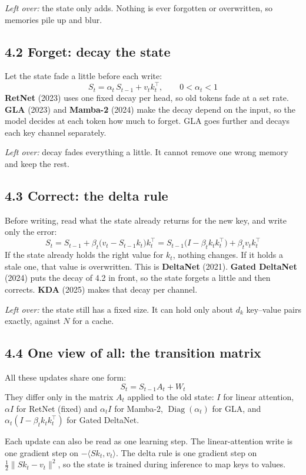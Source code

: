 \documentclass[11pt]{article}
\begin{document}
\emph{Left over:} the state only adds. Nothing is ever forgotten or overwritten, so memories pile up and blur.

\subsection{4.2 Forget: decay the state}

Let the state fade a little before each write:
\[
S_t=\alpha_t\,S_{t-1}+v_tk_t^{\top},\qquad 0<\alpha_t<1
\]
\textbf{RetNet} (2023) uses one fixed decay per head, so old tokens fade at a set rate. \textbf{GLA} (2023) and \textbf{Mamba-2} (2024) make the decay depend on the input, so the model decides at each token how much to forget. GLA goes further and decays each key channel separately.

\emph{Left over:} decay fades everything a little. It cannot remove one wrong memory and keep the rest.

\subsection{4.3 Correct: the delta rule}

Before writing, read what the state already returns for the new key, and write only the error:
\[
S_t=S_{t-1}+\beta_t\big(v_t-S_{t-1}k_t\big)k_t^{\top}=S_{t-1}\big(I-\beta_tk_tk_t^{\top}\big)+\beta_tv_tk_t^{\top}
\]
If the state already holds the right value for \(k_t\), nothing changes. If it holds a stale one, that value is overwritten. This is \textbf{DeltaNet} (2021). \textbf{Gated DeltaNet} (2024) puts the decay of 4.2 in front, so the state forgets a little and then corrects. \textbf{KDA} (2025) makes that decay per channel.

\emph{Left over:} the state still has a fixed size. It can hold only about \(d_k\) key--value pairs exactly, against \(N\) for a cache.

\subsection{4.4 One view of all: the transition matrix}

All these updates share one form:
\[
S_t=S_{t-1}A_t+W_t
\]
They differ only in the matrix \(A_t\) applied to the old state: \(I\) for linear attention, \(\alpha I\) for RetNet (fixed) and \(\alpha_tI\) for Mamba-2, \(\operatorname{Diag}(\alpha_t)\) for GLA, and \(\alpha_t(I-\beta_tk_tk_t^{\top})\) for Gated DeltaNet.

Each update can also be read as one learning step. The linear-attention write is one gradient step on \(-\langle Sk_t,v_t\rangle\). The delta rule is one gradient step on \(\tfrac12\lVert Sk_t-v_t\rVert^2\), so the state is trained during inference to map keys to values.
\end{document}
